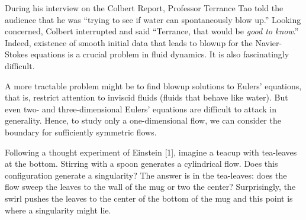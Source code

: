 \documentclass[12pt]{article}
\title{}
\begin{document}
%	 
%	

During his interview on the Colbert Report, Professor Terrance Tao told the audience that he was ``trying to see if water can spontaneously blow up.'' Looking concerned, Colbert interrupted and said ``Terrance, that would be \textit{good to know}.'' Indeed, existence of smooth initial data that leads to blowup for the Navier-Stokes equations is a crucial problem in fluid dynamics. It is also fascinatingly difficult.

A more tractable problem might be to find blowup solutions to Eulers' equations, that is, restrict attention to inviscid fluids (fluids that behave like water). But even two- and three-dimensional Eulers' equations are difficult to attack in generality. Hence, to study only a one-dimensional flow, we can consider the boundary for sufficiently symmetric flows.

Following a thought experiment of Einstein [1], imagine a teacup with tea-leaves at the bottom. Stirring with a spoon generates a cylindrical flow. Does this configuration generate a singularity? The answer is in the tea-leaves: does the flow sweep the leaves to the wall of the mug or two the center? Surprisingly, the swirl pushes the leaves to the center of the bottom of the mug and this point is where a singularity might lie.
\end{document}
